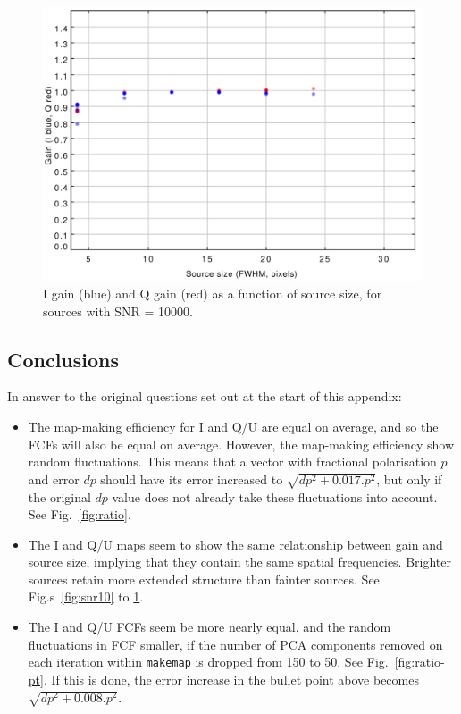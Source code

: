 \documentclass[twoside,11pt]{starlink}
\begin{document}
\begin{figure}
\includegraphics[width=0.9\columnwidth]{figs/snr10000}
\caption{I gain (blue) and Q gain (red) as a function of source size, for
sources with SNR = 10000.}
\label{fig:snr10000}
\end{figure}


\subsection{Conclusions}
In answer to the original questions set out at the start of this
appendix:

\begin{itemize}

\item The map-making efficiency for I and Q/U are equal on average, and
so the FCFs will also be equal on average. However, the map-making
efficiency show random fluctuations. This means that a vector with
fractional polarisation $p$ and error $dp$ should have its error
increased to $\sqrt{ dp^2 + 0.017.p^2 }$, but only if the original $dp$
value does not already take these fluctuations into account. See
Fig.~\ref{fig:ratio}.

\item The I and Q/U maps seem to show the same relationship between gain
and source size, implying that they contain the same spatial frequencies.
Brighter sources retain more extended structure than fainter sources. See
Fig.s~\ref{fig:snr10} to \ref{fig:snr10000}.


\item The I and Q/U FCFs seem be more nearly equal, and the random
fluctuations in FCF smaller, if the number of PCA components removed on
each iteration within \texttt{makemap} is dropped from 150 to 50.
See Fig.~\ref{fig:ratio-pt}. If this is done, the error increase in the
bullet point above becomes $\sqrt{ dp^2 + 0.008.p^2 }$.

\end{itemize}
\end{document}
